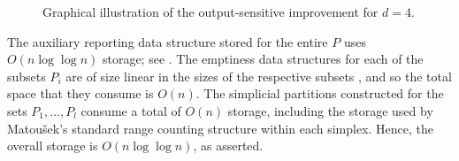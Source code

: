 \documentclass[11pt]{article}
\begin{document}
\begin{figure}[htb]
    \begin{center}
        \caption{Graphical illustration of the output-sensitive improvement for $d = 4$.}
        \label{fig_output_sensitive1}
    \end{center}
\end{figure}


The auxiliary reporting data structure stored for the entire $P$ uses $O(n \log \log n)$ storage; see \cite{mat92b}. The emptiness data structures for each of the subsets $P_{i}$ are of size linear in the sizes of the respective subsets \cite{mat92a}, and so the total space that they consume is $O(n)$. The simplicial partitions constructed for the sets $P_{1}, \ldots, P_{l}$ consume a total of $O(n)$ storage, including the storage used by Matou\v{s}ek's standard range counting structure \cite{mat92a} within each simplex. Hence, the overall storage is $O(n\log\log n)$, as asserted.
\end{document}
